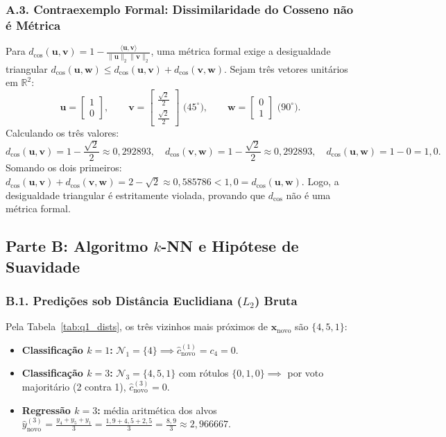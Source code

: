 \documentclass[11pt,a4paper]{article}
\begin{document}
\subsubsection*{A.3. Contraexemplo Formal: Dissimilaridade do Cosseno não é Métrica}
Para $d_{\cos}(\mathbf{u}, \mathbf{v}) = 1 - \frac{\langle \mathbf{u}, \mathbf{v} \rangle}{\|\mathbf{u}\|_2 \|\mathbf{v}\|_2}$, uma métrica formal exige a desigualdade triangular $d_{\cos}(\mathbf{u}, \mathbf{w}) \le d_{\cos}(\mathbf{u}, \mathbf{v}) + d_{\cos}(\mathbf{v}, \mathbf{w})$. Sejam três vetores unitários em $\mathbb{R}^2$:
\[
\mathbf{u} = \begin{bmatrix} 1 \\ 0 \end{bmatrix}, \qquad
\mathbf{v} = \begin{bmatrix} \frac{\sqrt{2}}{2} \\ \frac{\sqrt{2}}{2} \end{bmatrix} \text{ ($45^\circ$)}, \qquad
\mathbf{w} = \begin{bmatrix} 0 \\ 1 \end{bmatrix} \text{ ($90^\circ$)}.
\]
Calculando os três valores:
\[
d_{\cos}(\mathbf{u}, \mathbf{v}) = 1 - \frac{\sqrt{2}}{2} \approx 0{,}292893, \quad
d_{\cos}(\mathbf{v}, \mathbf{w}) = 1 - \frac{\sqrt{2}}{2} \approx 0{,}292893, \quad
d_{\cos}(\mathbf{u}, \mathbf{w}) = 1 - 0 = 1{,}0.
\]
Somando os dois primeiros: $d_{\cos}(\mathbf{u}, \mathbf{v}) + d_{\cos}(\mathbf{v}, \mathbf{w}) = 2 - \sqrt{2} \approx 0{,}585786 < 1{,}0 = d_{\cos}(\mathbf{u}, \mathbf{w})$. Logo, a desigualdade triangular é estritamente violada, provando que $d_{\cos}$ não é uma métrica formal.

\subsection{Parte B: Algoritmo $k$-NN e Hipótese de Suavidade}

\subsubsection*{B.1. Predições sob Distância Euclidiana ($L_2$) Bruta}
Pela Tabela~\ref{tab:q1_dists}, os três vizinhos mais próximos de $\mathbf{x}_{\text{novo}}$ são $\{4, 5, 1\}$:
\begin{itemize}
    \item \textbf{Classificação $k=1$:} $\mathcal{N}_1 = \{4\} \implies \hat{c}_{\text{novo}}^{(1)} = c_4 = 0$.
    \item \textbf{Classificação $k=3$:} $\mathcal{N}_3 = \{4, 5, 1\}$ com rótulos $\{0, 1, 0\} \implies$ por voto majoritário (2 contra 1), $\hat{c}_{\text{novo}}^{(3)} = 0$.
    \item \textbf{Regressão $k=3$:} média aritmética dos alvos $\hat{y}_{\text{novo}}^{(3)} = \frac{y_4 + y_5 + y_1}{3} = \frac{1{,}9 + 4{,}5 + 2{,}5}{3} = \frac{8{,}9}{3} \approx 2{,}966667$.
\end{itemize}
\end{document}

